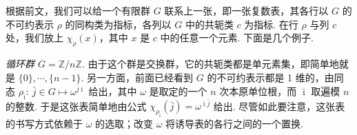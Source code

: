 \begin{numpara}[特征标表]\label{np:fg-4-2-11}
根据前文，我们可以给一个有限群 $G$ 联系上一张，即一张复数表，其各行以 $G$ 的不可约表示 $\rho$ 的同构类为指标，各列以 $G$ 中的共轭类 $c$ 为指标. 在行 $\rho$ 与列 $c$ 处，我们放上 $\chi_\rho(x)$，其中 $x$ 是 $c$ 中的任意一个元素. 下面是几个例子.

\emph{循环群 $G=\mathbb{Z}/n\mathbb{Z}$.} 由于这个群是交换群，它的共轭类都是单元素集，即简单地就是 $\{0\},\cdots,\{n-1\}$. 另一方面，前面已经看到 $G$ 的不可约表示都是 1 维的，由同态 $\rho_{\bar{\imath}}:\ \bar{j}\in G\mapsto\omega^{\bar{j}\bar{\imath}}$ 给出，其中 $\omega$ 是取定的一个 $n$ 次本原单位根，而 $\bar{\imath}$ 取遍模 $n$ 的整数. 于是这张表简单地由公式 $\chi_{\rho_{\bar{\imath}}}(\bar{j})=\omega^{\bar{\imath}\bar{j}}$ 给出. 尽管如此要注意，这张表的书写方式依赖于 $\omega$ 的选取；改变 $\omega$ 将诱导表的各行之间的一个置换.


\end{numpara}
